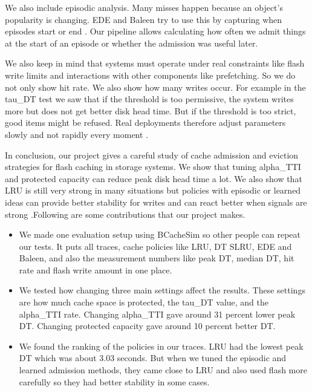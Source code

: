 \documentclass[sigconf]{acmart}
\begin{document}
We also include episodic analysis. Many misses happen because an object's popularity is changing. EDE and Baleen try to use this by capturing when episodes start or end \cite{wong2024baleen}. Our pipeline allows calculating how often we admit things at the start of an episode or whether the admission was useful later. 

We also keep in mind that systems must operate under real constraints like flash write limits and interactions with other components like prefetching. So we do not only show hit rate. We also show how many writes occur. For example in the tau\_DT test we saw that if the threshold is too permissive, the system writes more but does not get better disk head time. But if the threshold is too strict, good items might be refused. Real deployments therefore adjust parameters slowly and not rapidly every moment \cite{Yang2022CacheSack}.

In conclusion, our project gives a careful study of cache admission and eviction strategies for flash caching in storage systems. We show that tuning alpha\_TTI and protected capacity can reduce peak disk head time a lot. We also show that LRU is still very strong in many situations but policies with episodic or learned ideas can provide better stability for writes and can react better when signals are strong \cite{wong2024baleen}.Following are some contributions that our project makes.
\begin{itemize}
    \item We made one evaluation setup using BCacheSim so other people can repeat our tests. It puts all traces, cache policies like LRU, DT SLRU, EDE and Baleen, and also the measurement numbers like peak DT, median DT, hit rate and flash write amount in one place. 

    \item We tested how changing three main settings affect the results. These settings are how much cache space is protected, the tau\_DT value, and the alpha\_TTI rate. Changing alpha\_TTI gave around 31 percent lower peak DT. Changing protected capacity gave around 10 percent better DT. 

    \item We found the ranking of the policies in our traces. LRU had the lowest peak DT which was about 3.03 seconds. But when we tuned the episodic and learned admission methods, they came close to LRU and also used flash more carefully so they had better stability in some cases.

\end{itemize}
\end{document}
